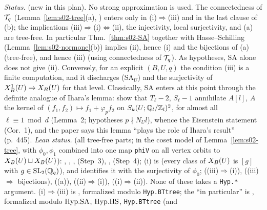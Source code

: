 \begin{sloppypar}\noindent\emph{Status.} \stproved{} (new in this plan). No strong approximation is used. The connectedness of $\mathcal{T}_q$
(Lemma~\ref{lem:s02-tree}(a), \stcited) enters only in (i)$\Rightarrow$(iii) and in the last clause of (b); the implications
(iii)$\Rightarrow$(i)$\Leftrightarrow$(ii), the injectivity, local surjectivity, and (a) are tree-free.
In particular Thm.~\ref{thm:s02-SA} together with Hasse--Schilling (Lemma~\ref{lem:s02-normone}(b)) implies (ii), hence (i) and the
bijections of (a) (tree-free), and hence (iii) (using connectedness of $\mathcal{T}_q$). As hypotheses, SA alone does not give (ii).
Conversely, for an explicit $(B,U,q)$ the condition (iii) is a finite computation, and it discharges (SA$_U$) and the surjectivity
of $X^1_B(U)\to X_B(U)$ for that level. Classically, SA enters at this point through the definite analogue of Ihara's lemma:
 show that $T_\ell-2$, $S_\ell-1$ annihilate $A[l]$, $A$ the kernel of
$(f_1,f_2)\mapsto f_1+\varphi_pf_2$ on $S_k(U;\mathbb{Q}_l/\mathbb{Z}_l)^2$, for almost all $\ell\equiv1\bmod d$ (Lemma~2; hypotheses $p\nmid N_U l$), whence the Eisenstein statement (Cor.~1), and the paper says this lemma ``plays the role of Ihara's result'' (p.~445).
\emph{Lean status.} \stformal{} (all tree-free parts; in the coset model of Lemma~\ref{lem:s02-tree}, with $\phi_0,\phi_1$ combined
into one map \texttt{phiV} on all vertex orbits to $X_B(U)\sqcup X_B(U)$):
, ,
,  (Step~3),
,  (Step~4);
(i) is  (every class of $X_B(U)$ is $[g]$ with $g\in\mathrm{SL}_2(\mathbb{Q}_q)$), and
 identifies it with the surjectivity of $\phi_0$;
 ((iii)$\Rightarrow$(i)),
 ((iii)$\Rightarrow$ bijections),
 ((a)),  ((ii)$\Rightarrow$(i)),
 ((i)$\Rightarrow$(ii)). None of these takes a \texttt{Hyp.*} argument.
(i)$\Rightarrow$(iii) is , formalized modulo \texttt{Hyp.BTtree}; the ``in particular''
is , formalized modulo $\mathrm{Hyp.SA}$, $\mathrm{Hyp.HS}$, \texttt{Hyp.BTtree} (and

\end{sloppypar}
